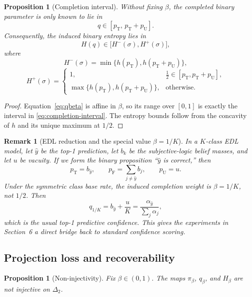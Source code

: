 \documentclass[11pt]{article}
\newtheorem{proposition}[definition]{Proposition}
\newtheorem{remark}[definition]{Remark}
\newcommand{\T}{\mathrm{T}}
\newcommand{\F}{\mathrm{F}}
\newcommand{\U}{\mathrm{U}}
\newcommand{\1}{\mathbf{1}}
\newcommand{\hbin}{h}
\begin{document}
\begin{proposition}[Completion interval]
\label{prop:interval-completion}
Without fixing $\beta$, the completed binary parameter is only known to lie in
\begin{equation}
q\in[p_\T,\,p_\T+p_\U].
\label{eq:completion-interval}
\end{equation}
Consequently, the induced binary entropy lies in
\begin{equation}
H(q)\in\bigl[H^{-}(\sigma),H^{+}(\sigma)\bigr],
\label{eq:entropy-interval}
\end{equation}
where
\[
H^{-}(\sigma)=\min\{\hbin(p_\T),\hbin(p_\T+p_\U)\},
\]
\[
H^{+}(\sigma)=
\begin{cases}
1,& \frac12\in[p_\T,p_\T+p_\U],\\
\max\{\hbin(p_\T),\hbin(p_\T+p_\U)\},& \text{otherwise.}
\end{cases}
\]
\end{proposition}

\begin{proof}
Equation~\eqref{eq:qbeta} is affine in $\beta$, so its range over $[0,1]$ is exactly the interval in \eqref{eq:completion-interval}. The entropy bounds follow from the concavity of $\hbin$ and its unique maximum at $1/2$.
\end{proof}

\begin{remark}[EDL reduction and the special value $\beta=1/K$]
\label{rem:edl-beta}
In a $K$-class EDL model, let $\hat y$ be the top-1 prediction, let $b_k$ be the subjective-logic belief masses, and let $u$ be vacuity. If we form the binary proposition “$\hat y$ is correct,” then
\[
p_\T=b_{\hat y},
\qquad
p_\F=\sum_{j\neq \hat y} b_j,
\qquad
p_\U=u.
\]
Under the symmetric class base rate, the induced completion weight is $\beta=1/K$, not $1/2$. Then
\[
q_{1/K}=b_{\hat y}+\frac{u}{K}=\frac{\alpha_{\hat y}}{\sum_j \alpha_j},
\]
which is the usual top-1 predictive confidence. This gives the experiments in Section~6 a direct bridge back to standard confidence scoring.
\end{remark}

\subsection{Projection loss and recoverability}

\begin{proposition}[Non-injectivity]
\label{prop:noninjective}
Fix $\beta\in(0,1)$. The maps $\pi_\beta$, $q_\beta$, and $H_\beta$ are not injective on $\Delta_2$.
\end{proposition}
\end{document}
